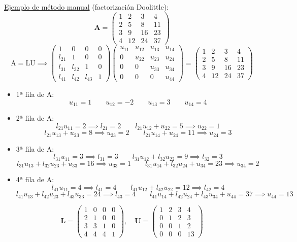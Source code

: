 \documentclass{article}
\begin{document}
\underline{Ejemplo de método manual} (factorización Doolittle):
\\
$$\textbf{A}=\begin{pmatrix}
1 & 2 & 3 & 4 \\
2 & 5 & 8 & 11 \\
3 & 9 & 16 & 23 \\
4 & 12 & 24 & 37
\end{pmatrix}$$
$$\text{A}=\text{LU}\implies\begin{pmatrix}
1 & 0 & 0 & 0 \\
l_{21} & 1 & 0 & 0 \\
l_{31} & l_{32} & 1 & 0 \\
l_{41} & l_{42} & l_{43} & 1
\end{pmatrix}\begin{pmatrix}
u_{11} & u_{12} & u_{13} & u_{14} \\
0 & u_{22} & u_{23} & u_{24} \\
0 & 0 & u_{33} & u_{34} \\
0 & 0 & 0 & u_{44}
\end{pmatrix}=\begin{pmatrix}
1 & 2 & 3 & 4 \\
2 & 5 & 8 & 11 \\
3 & 9 & 16 & 23 \\
4 & 12 & 24 & 37
\end{pmatrix}$$
\begin{itemize}
\item 1ª fila de A:
$$u_{11}=1\quad\quad u_{12}=-2\quad\quad u_{13}=3\quad\quad u_{14}=4$$
\item 2ª fila de A:
$$l_{21}u_{11}=2\implies l_{21}=2\quad\quad l_{21}u_{12}+u_{22}=5\implies u_{22}=1$$
$$l_{21}u_{13}+u_{23}=8\implies u_{23}=2\quad\quad l_{21}u_{14}+u_{24}=11\implies u_{24}=3$$
\item 3ª fila de A:
$$l_{31}u_{11}=3\implies l_{31}=3\quad\quad l_{31}u_{12}+l_{32}u_{22}=9\implies l_{32}=3$$
$$l_{31}u_{13}+l_{32}u_{23}+u_{33}=16\implies u_{33}=1\quad\quad l_{31}u_{14}+l_{32}u_{24}+u_{34}=23\implies u_{34}=2$$
\item 4ª fila de A:
$$l_{41}u_{11}=4\implies l_{41}=4\quad\quad l_{41}u_{12}+l_{42}u_{22}=12\implies l_{42}=4$$
$$l_{41}u_{13}+l_{42}u_{23}+l_{43}u_{33}=24\implies l_{43}=4\quad\quad l_{41}u_{14}+l_{42}u_{24}+l_{43}u_{34}+u_{44}=37\implies u_{44}=13$$
\end{itemize}
$$\textbf{L}=\begin{pmatrix}
1 & 0 & 0 & 0 \\
2 & 1 & 0 & 0 \\
3 & 3 & 1 & 0 \\
4 & 4 & 4 & 1
\end{pmatrix},\quad\textbf{U}=\begin{pmatrix}
1 & 2 & 3 & 4 \\
0 & 1 & 2 & 3 \\
0 & 0 & 1 & 2 \\
0 & 0 & 0 & 13
\end{pmatrix}$$
\end{document}
